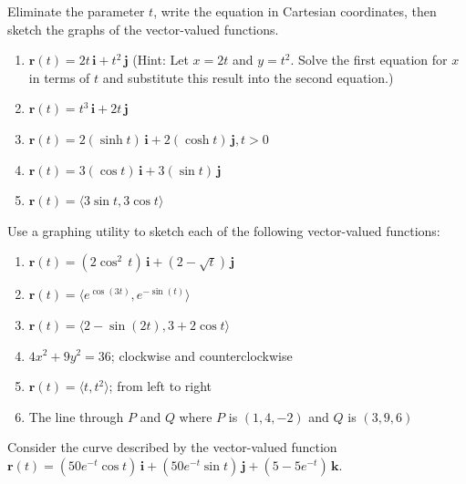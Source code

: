 \documentclass{exercises}
\begin{document}
Eliminate the parameter $t$, write the equation in Cartesian coordinates, then sketch the graphs of the vector-valued functions.

\begin{enumerate}[resume]
\item $\mathbf{r}(t)=2t\,\mathbf{i}+t^{2}\,\mathbf{j}$ (Hint: Let $x=2t$ and $y=t^{2}$. Solve the first equation for $x$ in terms of $t$ and substitute this result into the second equation.)
\item $\mathbf{r}(t)=t^{3}\,\mathbf{i}+2t\,\mathbf{j}$
\item $\mathbf{r}(t)=2(\sinh t)\,\mathbf{i}+2(\cosh t)\,\mathbf{j},t>0$
\item $\mathbf{r}(t)=3(\cos t)\,\mathbf{i}+3(\sin t)\,\mathbf{j}$
\item $\mathbf{r}(t)=\langle3\sin t,3\cos t\rangle$
\end{enumerate}

Use a graphing utility to sketch each of the following vector-valued functions:

\begin{enumerate}[resume]
\item \techrequired $\mathbf{r}(t)=\left(2\cos^{2}\,t\right)\,\mathbf{i}+(2-\sqrt{t})\,\mathbf{j}$
\item \techrequired $\mathbf{r}(t)=\langle e^{\cos(3t)},e^{-\sin(t)}\rangle$
\item \techrequired $\mathbf{r}(t)=\langle2-\sin(2t),3+2\cos t\rangle$
\item $4x^{2}+9y^{2}=36$; clockwise and counterclockwise
\item $\mathbf{r}(t)=\langle t,t^{2}\rangle$; from left to right
\item The line through $P$ and $Q$ where $P$ is $(1,4,-2)$ and $Q$ is $(3,9,6)$
\end{enumerate}

Consider the curve described by the vector-valued function $\mathbf{r}(t)=(50e^{-t}\cos t)\,\mathbf{i}+(50e^{-t}\sin t)\,\mathbf{j}+(5-5e^{-t})\,\mathbf{k}$.
\end{document}
